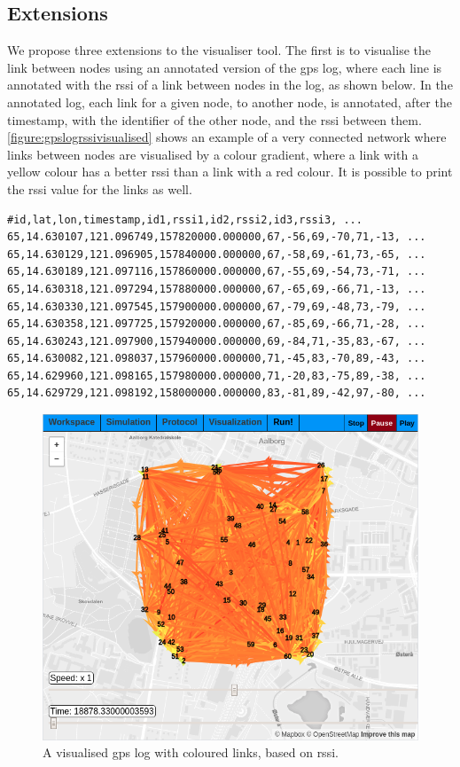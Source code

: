 \subsection{Extensions}
We propose three extensions to the visualiser tool. The first is to visualise the link between nodes using an
annotated version of the \acrshort{gps} log, where each line is annotated with the \gls{rssi} of a link
between nodes in the log, as shown below. In the annotated log, each link for a given node, to another node,
is annotated, after the timestamp, with the identifier of the other node, and the \gls{rssi} between them.
\autoref{figure:gpslogrssivisualised} shows an example of a very connected
network where links between nodes are visualised by a colour gradient, where a link with a yellow colour has a
better \gls{rssi} than a link with a red colour. It is possible to print the \gls{rssi} value for the links as
well.
%
\begin{verbatim}
#id,lat,lon,timestamp,id1,rssi1,id2,rssi2,id3,rssi3, ...
65,14.630107,121.096749,157820000.000000,67,-56,69,-70,71,-13, ...
65,14.630129,121.096905,157840000.000000,67,-58,69,-61,73,-65, ...
65,14.630189,121.097116,157860000.000000,67,-55,69,-54,73,-71, ...
65,14.630318,121.097294,157880000.000000,67,-65,69,-66,71,-13, ...
65,14.630330,121.097545,157900000.000000,67,-79,69,-48,73,-79, ...
65,14.630358,121.097725,157920000.000000,67,-85,69,-66,71,-28, ...
65,14.630243,121.097900,157940000.000000,69,-84,71,-35,83,-67, ...
65,14.630082,121.098037,157960000.000000,71,-45,83,-70,89,-43, ...
65,14.629960,121.098165,157980000.000000,71,-20,83,-75,89,-38, ...
65,14.629729,121.098192,158000000.000000,83,-81,89,-42,97,-80, ...
\end{verbatim}

\begin{figure}[H]
    \centering
    \includegraphics[width=\textwidth]{figures/visualiser/gpslog+rssi.png}
    \caption{A visualised \acrshort{gps} log with coloured links, based on \gls{rssi}.}
    \label{figure:gpslogrssivisualised}
\end{figure}

